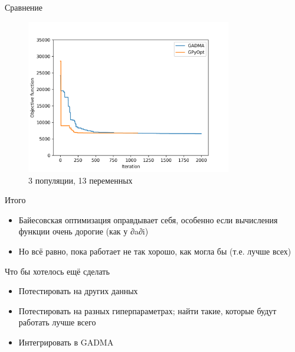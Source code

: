\documentclass[
  russian,
  ignorenonframetext,
]{beamer}
\providecommand{\tightlist}{%
  \setlength{\itemsep}{0pt}\setlength{\parskip}{0pt}}
\begin{document}
\begin{frame}{Сравнение}
\protect\hypertarget{ux441ux440ux430ux432ux43dux435ux43dux438ux435-1}{}

\begin{figure}
\centering
\includegraphics[width=0.8\textwidth,height=\textheight]{./plots/3pop_13.best.log.png}
\caption{3 популяции, 13 переменных}
\end{figure}

\end{frame}

\begin{frame}{Итого}
\protect\hypertarget{ux438ux442ux43eux433ux43e}{}

\begin{itemize}
\tightlist
\item
  Байесовская оптимизация оправдывает себя, особенно если вычисления
  функции очень дорогие (как у ∂a∂i)
\item
  Но всё равно, \alert{пока} работает не так хорошо, как могла бы (т.е.
  лучше всех)
\end{itemize}

\end{frame}

\begin{frame}{Что бы хотелось ещё сделать}
\protect\hypertarget{ux447ux442ux43e-ux431ux44b-ux445ux43eux442ux435ux43bux43eux441ux44c-ux435ux449ux451-ux441ux434ux435ux43bux430ux442ux44c}{}

\begin{itemize}
\tightlist
\item
  Потестировать на других данных
\item
  Потестировать на разных гиперпараметрах; найти такие, которые будут работать лучше всего

\item
  Интегрировать в GADMA
\end{itemize}

\end{frame}
\end{document}
